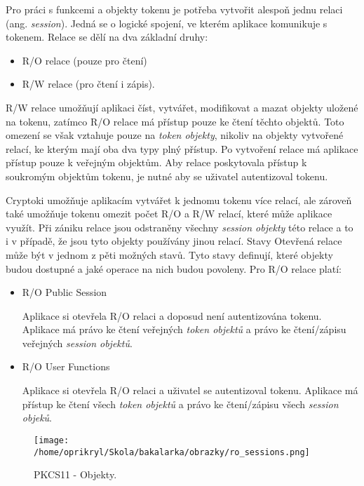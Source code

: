 \documentclass[]{fithesis3}
\begin{document}
		Pro práci s funkcemi a objekty tokenu je potřeba vytvořit alespoň jednu relaci (ang. 				\textit{session}). Jedná se o logické spojení, ve kterém aplikace komunikuje s tokenem. 			Relace se dělí na dva základní druhy:
		\begin{itemize}
			\item R/O relace (pouze pro čtení) 
			\item R/W relace (pro čtení i zápis).
		\end{itemize}

		R/W relace umožňují aplikaci číst, vytvářet, modifikovat a mazat objekty uložené na 				tokenu, zatímco R/O relace má přístup pouze ke čtení těchto objektů. Toto omezení se 				však vztahuje pouze na \textit{token objekty}, nikoliv na objekty vytvořené relací, ke 				kterým mají oba dva typy plný přístup. Po vytvoření relace má aplikace přístup pouze k 			veřejným objektům. Aby relace poskytovala přístup k soukromým objektům tokenu, je 				nutné aby se uživatel autentizoval tokenu. 

		Cryptoki umožňuje aplikacím vytvářet k jednomu tokenu více relací, ale zároveň také 				umožňuje tokenu omezit počet R/O a R/W relací, které může aplikace využít. Při zániku 			relace jsou odstraněny všechny \textit{session objekty} této relace a to i v případě, že 				jsou tyto objekty používány jinou relací.
		\newline
		\newline
		Stavy
		\newline
		Otevřená relace může být v jednom z pěti možných stavů. Tyto stavy definují, které 				objekty budou dostupné a jaké operace na nich budou povoleny. Pro R/O relace platí:

		\begin{itemize}
			\item R/O Public Session

			Aplikace si otevřela R/O relaci a doposud není autentizována tokenu. Aplikace má 					právo ke čtení veřejných \textit{token objektů} a právo ke čtení/zápisu veřejných 					\textit{session objektů}.
	
			\item R/O User Functions

			Aplikace si otevřela R/O relaci a uživatel se autentizoval tokenu. Aplikace má přístup 				ke čtení všech \textit{token objektů} a právo ke čtení/zápisu všech \textit{session 				objeků}.
		\end{itemize}

		\begin{figure}[!ht]
  			\begin{minipage}{1.00\textwidth}
    				\texttt{[image: /home/oprikryl/Skola/bakalarka/obrazky/ro\_sessions.png]}
  			\end{minipage}
 			\caption{PKCS11 - Objekty.}
  			\label{fig:PKCS11 - Objekty.}
		\end{figure}
\end{document}
